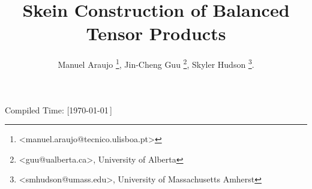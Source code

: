 \title{\vspace{-30pt} Skein Construction of Balanced Tensor Products}
\author{
  Manuel Araujo \thanks{<manuel.araujo@tecnico.ulisboa.pt>},
  Jin-Cheng Guu \thanks{<guu@ualberta.ca>, University of Alberta},
  Skyler Hudson \thanks{<smhudson@umass.edu>, University of Massachusetts Amherst}.
}
\date{}

\newcommand{\III}[9]{%
  {}^{#1}_{#2} I^{#3}_{#4}
  \left(
    \begin{matrix}
      #5 \\ {}\\ #6
    \end{matrix}
    \,\middle|\,
    \begin{matrix}
      #7 \\ #8 \\ #9
    \end{matrix}
  \right)
}
\newcommand{\II}[7]{%
  {}^{#1}_{#2} I^{#3}_{#4}
  \left( #5, #6
    \,\middle|\,
    #7
  \right)
}



\maketitle

\vspace{-30pt}


\begin{flushright}
  \tiny{Compiled Time: [\today\,\DTMcurrenttime]}
\end{flushright}

\vspace{-25pt}
\tableofcontents

